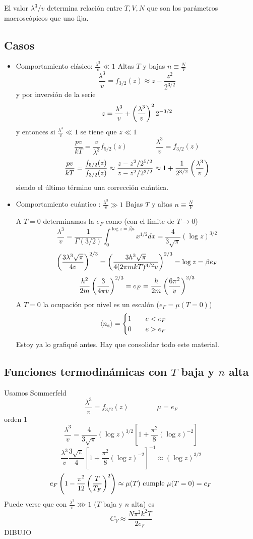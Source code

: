 \documentclass[10pt,oneside]{CBFT_book}
\begin{document}
El valor $ \lambda^3 / v $ determina relación entre $ T,V,N $ que son los parámetros macroscópicos que uno fija.

\subsection{Casos}

\begin{itemize}
 \item Comportamiento clásico: $\frac{\lambda^3}{v} \ll 1$ Altas $T$ y bajas $n\equiv \frac{N}{V}$ 
 \[
	\frac{\lambda^3}{v} = f_{3/2}(z) \approx z - \frac{z^2}{2^{3/2}}
 \]
 y por inversión de la serie 
 \[
	z = \frac{\lambda^3}{v} + \left( \frac{ \lambda^3 }{ v } \right)^2 2^{-3/2}
 \]
 y entonces si $\frac{\lambda^3}{v} \ll 1$ se tiene que $ z \ll 1 $
 \[
	\frac{pv}{kT} = \frac{v}{\lambda^3} f_{5/2}(z) \qquad \qquad \frac{\lambda^3}{v} = f_{3/2}(z)
 \]
 \[
	\frac{pv}{kT} = \frac{f_{5/2}(z)}{f_{3/2}(z)} \approx \frac{z - z^2/2^{5/2}}{z - z^2/2^{3/2}}
	\approx 1 + \frac{1}{2^{3/2}} \left( \frac{ \lambda^3 }{ v } \right)
 \]
 siendo el último término una corrección cuántica.
 
  \item Comportamiento cuántico : $\frac{\lambda^3}{v} \gg 1$ Bajas $T$ y altas $n\equiv \frac{N}{V}$ 
  
  A $ T = 0 $ determinamos la $ e_F $ como (con el límite de $T\to 0$)
  \[
	\frac{\lambda^3}{v} = \frac{1}{\Gamma(3/2)} \int_0^{\log z = \beta\mu} x^{1/2} dx = 
	 \frac{4}{ 3 \sqrt{\pi} } (\log z )^{3/2}
  \]
  \[
	\left( \frac{  3  \lambda^3  \sqrt{\pi}  }{ 4v } \right)^{2/3} = \left( \frac{  3  h^3  \sqrt{\pi}  }{ 4(2\pi m k T)^{3/2}v } \right)^{2/3} 
	= \log z =  \beta e_F
  \]
  \[
	\frac{h^2}{2m}\left( \frac{ 3 }{ 4\pi v } \right)^{2/3} = e_F = \frac{\hbar}{2m}\left( \frac{ 6\pi^2 }{ v } \right)^{2/3}
  \]
  A $ T = 0 $ la ocupación por nivel es un escalón ($e_F = \mu(T=0) $) 
  \[
	\braket{n_e} = 	\begin{cases}
			1 \qquad e < e_F \\
			0 \qquad e > e_F
			\end{cases}
  \]
  Estoy ya lo grafiqué antes. Hay que consolidar todo este material.
\end{itemize}

\subsection{Funciones termodinámicas con $T$ baja y $n$ alta}

Usamos Sommerfeld
\[
	\frac{\lambda^3}{v} = f_{3/2}(z) \qquad  \qquad \mu = e_F
\]
orden 1
\[
	\frac{\lambda^3}{v} =  
	\frac{4}{3\sqrt{\pi} } (\log z )^{3/2} \left[ 1 + \frac{\pi^2}{8}(\log z )^{-2} \right] 
\]
\[
	\frac{\lambda^3}{v} \frac{3\sqrt{\pi} }{4} \left[ 1 + \frac{\pi^2}{8}(\log z )^{-2} \right]^{-1} 
	\approx (\log z)^{3/2} 
\]
\[
	e_F \left( 1- \frac{\pi^2}{12}\left( \frac{ T }{ T_F } \right)^2 \right) \approx \mu( T ) \text{ cumple $\mu(T=0)=e_F$}
\]
Puede verse que con $ \frac{\lambda^3}{v} \ggg 1 $ ($T$ baja y $n$ alta) es
\[
	C_V \approx \frac{N \pi^2 k^2 T}{2 e_F}
\]
DIBUJO
\end{document}
